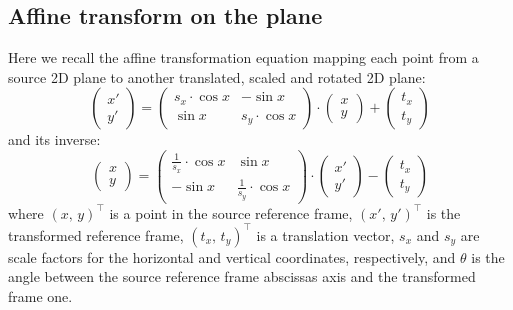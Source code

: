 \subsection{Affine transform on the plane}
	Here we recall the affine transformation equation mapping each point from a source 2D plane to another translated, scaled and rotated 2D plane: 
	\begin{equation}
		\left(\begin{array}{c}
			x' \\ y'
		\end{array}\right)
		=
		\left(\begin{array}{cc}
			s_x \cdot \cos{x} & -\sin{x} \\ \sin{x} & s_y \cdot \cos{x}
		\end{array}\right)
		\cdot
		\left(\begin{array}{c}
		x \\ y
		\end{array}\right)
		+
		\left(\begin{array}{c}
		t_x \\ t_y
		\end{array}\right)
	\end{equation}
	and its inverse:
	\begin{equation}
		\left(\begin{array}{c}
			x \\ y
		\end{array}\right)
		=
		\left(\begin{array}{cc}
			\frac{1}{s_x} \cdot \cos{x} & \sin{x} \\ -\sin{x} & \frac{1}{s_y} \cdot \cos{x}
		\end{array}\right)
		\cdot
		\left(\begin{array}{c}
			x' \\ y'
		\end{array}\right)
		-
		\left(\begin{array}{c}
			t_x \\ t_y
		\end{array}\right)
	\end{equation}
	where $(x,\,y)^\top$ is a point in the source reference frame, $(x',\,y')^\top$ is the transformed reference frame, $(t_x,\,t_y)^\top$ is a translation vector, $s_x$ and $s_y$ are scale factors for the horizontal and vertical coordinates, respectively, and $\theta$ is the angle between the source reference frame abscissas axis and the transformed frame one. 

